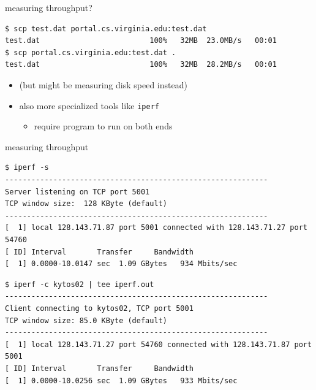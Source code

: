 \begin{frame}[fragile]{measuring throughput?}
\begin{Verbatim}[fontsize=\fontsize{10}{11}]
$ scp test.dat portal.cs.virginia.edu:test.dat
test.dat                         100%   32MB  23.0MB/s   00:01    
$ scp portal.cs.virginia.edu:test.dat .
test.dat                         100%   32MB  28.2MB/s   00:01   
\end{Verbatim}
\begin{itemize}
\item (but might be measuring disk speed instead)
\vspace{.5cm}
\item also more specialized tools like \texttt{iperf}
    \begin{itemize}
    \item require program to run on both ends
    \end{itemize}
\end{itemize}
\end{frame}

\begin{frame}[fragile]{measuring throughput}
\begin{Verbatim}[fontsize=\fontsize{10}{11}]
$ iperf -s
------------------------------------------------------------
Server listening on TCP port 5001
TCP window size:  128 KByte (default)
------------------------------------------------------------
[  1] local 128.143.71.87 port 5001 connected with 128.143.71.27 port 54760
[ ID] Interval       Transfer     Bandwidth
[  1] 0.0000-10.0147 sec  1.09 GBytes   934 Mbits/sec
\end{Verbatim}
\hline
\begin{Verbatim}[fontsize=\fontsize{10}{11}]
$ iperf -c kytos02 | tee iperf.out
------------------------------------------------------------
Client connecting to kytos02, TCP port 5001
TCP window size: 85.0 KByte (default)
------------------------------------------------------------
[  1] local 128.143.71.27 port 54760 connected with 128.143.71.87 port 5001
[ ID] Interval       Transfer     Bandwidth
[  1] 0.0000-10.0256 sec  1.09 GBytes   933 Mbits/sec
\end{Verbatim}
\end{frame}

